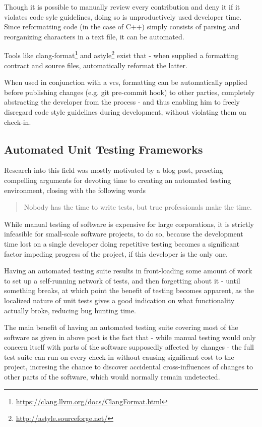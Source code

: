 Though it is possible to manually review every contribution and deny it if it violates code syle guidelines, doing so is unproductively used developer time. Since reformatting code (in the case of C++) simply consists of parsing and reorganizing characters in a text file, it can be automated.

Tools like clang-format\footnote{\url{https://clang.llvm.org/docs/ClangFormat.html}} and astyle\footnote{\url{http://astyle.sourceforge.net/}} exist that - when supplied a formatting contract and source files, automatically reformat the latter.

When used in conjunction with a \gls{vcs}, formatting can be automatically applied before publishing changes (e.g. git pre-commit hook) to other parties, completely abstracting the developer from the process - and thus enabling him to freely disregard code style guidelines during development, without violating them on check-in.

\subsection{Automated Unit Testing Frameworks}

Research into this field was mostly motivated by a blog post, preseting compelling arguments for devoting time to creating an automated testing environment, closing with the following words
\begin{quote}
Nobody has the time to write tests, but true professionals make the time. 
\end{quote}

While manual testing of software is expensive for large corporations, it is strictly infeasible for small-scale software projects, to do so, because the development time lost on a single developer doing repetitive testing becomes a significant factor impeding progress of the project, if this developer is the only one. 

Having an automated testing suite results in front-loading some amount of work to set up a self-running network of tests, and then forgetting about it - until something breaks, at which point the benefit of testing becomes apparent, as the localized nature of unit tests gives a good indication on what functionality actually broke, reducing bug hunting time.

The main benefit of having an automated testing suite covering most of the software as given in above post is the fact that - while manual testing would only concern itself with parts of the software supposedly affected by changes - the full test suite can run on every check-in without causing significant cost to the project, incresing the chance to discover accidental cross-influences of changes to other parts of the software, which would normally remain undetected.

